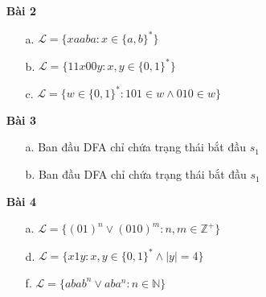 \documentclass[12pt, a4paper]{article}
\begin{document}
	\begin{itemize}
		
		\item[ \textbf{Bài 2} ]
		
		\begin{itemize}
			
			\item[a.] $\mathcal{L} = \{ xaaba: x \in \{a, b\}^* \}$
		
			
			\bigskip
			
			\item[b.] $\mathcal{L} = \{ 11x00y: x,y \in \{0,1\}^* \}$
			
			
			
			\item[c.] $\mathcal{L} = \{ w \in \{0,1\}^*: 101 \in w \wedge 010 \in w \}$
			
			
			
		\end{itemize}
		
		\item[ \textbf{Bài 3} ]
		
		\begin{itemize}
		
			\item[a.] Ban đầu DFA chỉ chứa trạng thái bắt đầu $s_1$
							
			
			\item[b.] Ban đầu DFA chỉ chứa trạng thái bắt đầu $s_1$
			
		
		\end{itemize}				
		
		\item[ \textbf{Bài 4} ]
			
		\begin{itemize}
			
			\item[a.] $\mathcal{L} = \{ (01)^n \vee (010)^m: n,m \in \mathbb{Z}^+ \}$	
			
			
			
			\item[d.] $\mathcal{L} = \{ x1y: x,y \in \{0,1\}^* \wedge |y| = 4 \}$
			
			
			
			\item[f.] $\mathcal{L} = \{ abab^n \vee aba^n: n \in \mathbb{N} \}$
			
			
			

\end{itemize}
\end{itemize}
\end{document}
